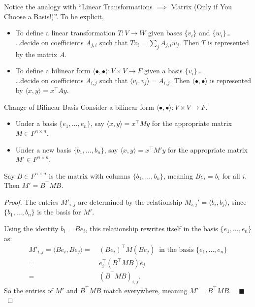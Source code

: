 Notice the analogy with ``Linear Transformations $\implies$ Matrix (Only if You Choose a Basis!)''.  To be explicit,
\begin{itemize}
    \item To define a linear transformation $T: V \to W$ given bases $\{v_i\}$ and $\{w_i\}$\dots \\
    \dots decide on coefficients $A_{j, i}$ such that $Tv_i = \sum_{j} A_{j, i}w_j$.  Then $T$ is represented by the matrix $A$.
    \item To define a bilinear form $\langle \bullet, \bullet \rangle : V \times V \to F$ given a basis $\{v_i\}$\dots \\
    \dots decide on coefficients $A_{i, j}$ such that $\langle v_i, v_j \rangle = A_{i, j}$.  Then $\langle \bullet, \bullet \rangle$ is represented by $\langle x, y \rangle = x^{\top}Ay$.
\end{itemize}

\begin{theorem}{Change of Bilinear Basis}
    Consider a bilinear form $\langle \bullet, \bullet \rangle: V \times V \to F$.
    \begin{itemize}
        \item Under a basis $\{e_1, \dots, e_n\}$, say $\langle x, y \rangle = x^{\top}My$ for the appropriate matrix $M \in F^{n \times n}$.
        \item Under a new basis $\{b_1, \dots, b_n\}$, say $\langle x, y \rangle = x^{\top}M'y$ for the appropriate matrix $M' \in F^{n \times n}$.
    \end{itemize}
    Say $B \in F^{n \times n}$ is the matrix with columns $\{b_1, \dots, b_n\}$, meaning $Be_i = b_i$ for all $i$. Then $M' = B^{\top}MB$.
\end{theorem}

\begin{proof}
    The entries $M'_{i, j}$ are determined by the relationship $M_{i, j}' = \langle b_i, b_j \rangle$, since $\{b_1, \dots, b_n\}$ is the basis for $M'$.
    
    Using the identity $b_i = Be_i$, this relationship rewrites itself in the basis $\{e_1, \dots, e_n\}$ as:
    \begin{align*} M'_{i, j} = \langle Be_i, Be_j \rangle = \ & (Be_i)^{\top}M (Be_j) ~ \text{ in the basis } \{e_1, \dots, e_n\} \\
    = \ & e_i^{\top}(B^{\top}MB)e_j \\ = \ & (B^{\top}MB)_{i, j}. \end{align*}
    So the entries of $M'$ and $B^{\top}MB$ match everywhere, meaning $M' = B^{\top}MB$. ~ $\blacksquare$
\end{proof}

